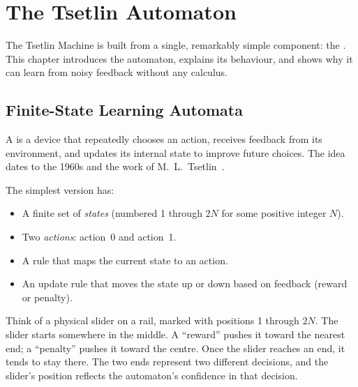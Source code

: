 \chapter{The Tsetlin Automaton}
\label{ch:automaton}

The Tsetlin Machine is built from a single, remarkably simple
component: the . This chapter introduces the
automaton, explains its behaviour, and shows why it can learn from
noisy feedback without any calculus.


\section{Finite-State Learning Automata}
\label{sec:automata-intro}

A  is a device that repeatedly chooses an
action, receives feedback from its environment, and updates its
internal state to improve future choices. The idea dates to the 1960s
and the work of M.~L.~Tsetlin~\cite{tsetlin1961}.

The simplest version has:
\begin{itemize}
  \item A finite set of \emph{states} (numbered 1 through $2N$ for
    some positive integer $N$).
  \item Two \emph{actions}: action~0 and action~1.
  \item A rule that maps the current state to an action.
  \item An update rule that moves the state up or down based on
    feedback (reward or penalty).
\end{itemize}

\begin{analogy}
Think of a physical slider on a rail, marked with positions 1 through
$2N$. The slider starts somewhere in the middle. A ``reward'' pushes
it toward the nearest end; a ``penalty'' pushes it toward the centre.
Once the slider reaches an end, it tends to stay there. The two ends
represent two different decisions, and the slider's position reflects
the automaton's confidence in that decision.
\end{analogy}


